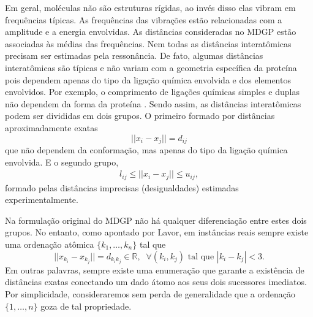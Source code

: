 \documentclass[10pt,a4paper]{article}
\newcommand{\R}{\mathbb{R}}
\begin{document}
Em geral, moléculas não são estruturas rígidas, ao invés disso elas vibram em frequências típicas. As frequências das vibrações estão relacionadas com a amplitude e a energia envolvidas. As distâncias consideradas no MDGP estão associadas às médias das frequências. Nem todas as distâncias interatômicas precisam ser estimadas pela ressonância. De fato, algumas distâncias interatômicas são típicas e não variam com a geometria específica da proteína pois dependem apenas do tipo da ligação química envolvida e dos elementos envolvidos. Por exemplo, o comprimento de ligações químicas simples e duplas não dependem da forma da proteína \cite{Schlick2010}. Sendo assim, as distâncias interatômicas podem ser divididas em dois grupos. O primeiro formado por distâncias aproximadamente exatas
\begin{equation}\label{eq:equalities}
||x_i-x_j|| = d_{ij}
\end{equation} que não dependem da conformação, mas apenas do tipo da ligação química envolvida. E o segundo grupo,
\begin{eqnarray}\label{eq:inequalities}
l_{ij}\leq ||x_i-x_j|| \leq u_{ij},
\end{eqnarray} formado pelas distâncias imprecisas (desigualdades) estimadas experimentalmente. 

Na formulação original do MDGP não há qualquer diferenciação entre estes dois grupos. No entanto, como apontado por Lavor, em instâncias reais sempre existe uma ordenação atômica $\{k_1,\ldots,k_n\}$ tal que
\begin{equation}
||x_{k_i}-x_{k_j}|| = d_{{k_ik_j}}\in\R,\;\;\forall (k_i,k_j)\mbox{ tal que }|k_i-k_j|<3.
\end{equation}
Em outras palavras, sempre existe uma enumeração que garante a existência de distâncias exatas conectando um dado átomo aos seus dois sucessores imediatos. Por simplicidade, consideraremos sem perda de generalidade que a ordenação $\{1,\ldots,n\}$ goza de tal propriedade.
\end{document}
